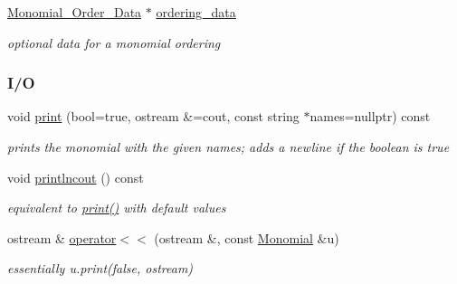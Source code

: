 \begin{DoxyCompactItemize}
\mbox{\label{group__polygroup_ae91138ece28b35404366c1a47e283034}} 
\hyperlink{group__orderinggroup_class_monomial___order___data}{Monomial\+\_\+\+Order\+\_\+\+Data} $\ast$ \hyperlink{group__polygroup_ae91138ece28b35404366c1a47e283034}{ordering\+\_\+data}
\begin{DoxyCompactList}\small\item\em optional data for a monomial ordering \end{DoxyCompactList}\end{DoxyCompactItemize}
\subsubsection*{I/O}
\begin{DoxyCompactItemize}
\item 
\mbox{\label{group__polygroup_ad428399071b7e7b63604d506b5dfdf93}} 
void \hyperlink{group__polygroup_ad428399071b7e7b63604d506b5dfdf93}{print} (bool=true, ostream \&=cout, const string $\ast$names=nullptr) const
\begin{DoxyCompactList}\small\item\em prints the monomial with the given names; adds a newline if the boolean is true \end{DoxyCompactList}\item 
\mbox{\label{group__polygroup_a34143922dd6ce2d44a62777a8948bf97}} 
void \hyperlink{group__polygroup_a34143922dd6ce2d44a62777a8948bf97}{printlncout} () const
\begin{DoxyCompactList}\small\item\em equivalent to {\ttfamily \hyperlink{group__polygroup_ad428399071b7e7b63604d506b5dfdf93}{print()}} with default values \end{DoxyCompactList}\item 
\mbox{\label{group__polygroup_a76dc21e1d0624ecd913ce3e2f83c0f13}} 
ostream \& \hyperlink{group__polygroup_a76dc21e1d0624ecd913ce3e2f83c0f13}{operator$<$$<$} (ostream \&, const \hyperlink{group__polygroup_class_monomial}{Monomial} \&u)
\begin{DoxyCompactList}\small\item\em essentially {\ttfamily u.\+print(false, ostream)} \end{DoxyCompactList}\end{DoxyCompactItemize}


